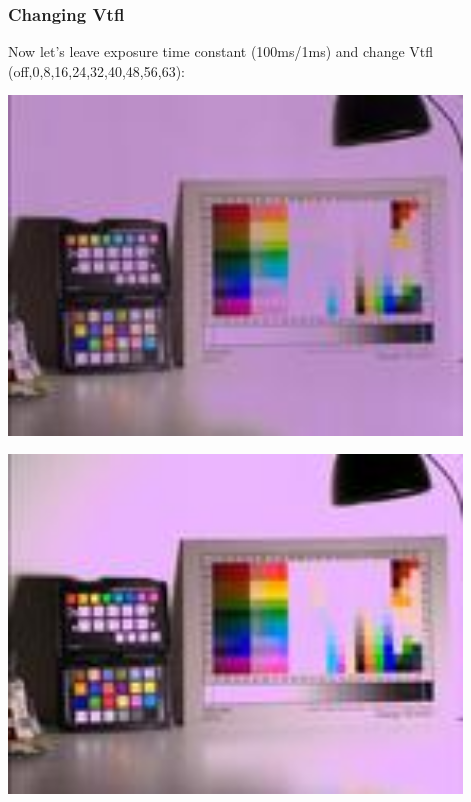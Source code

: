 \subsubsection{Changing Vtfl}

Now let's leave exposure time constant (100ms/1ms) and change Vtfl (off,0,8,16,24,32,40,48,56,63): 

\begin{center}
\includegraphics[height=9cm]{images/100ms-1ms-00-tiny}
\end{center}

\begin{center}
\includegraphics[height=9cm]{images/100ms-1ms-0-tiny}
\end{center}


